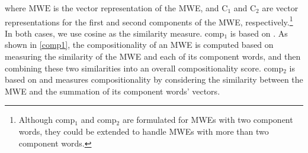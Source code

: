 \documentclass[11pt]{article}
\newcommand{\compone}{comp$_1$\xspace}
\newcommand{\comptwo}{comp$_2$\xspace}
\begin{document}
\noindent
where $\mathrm{MWE}$ is the vector representation of the MWE, and
$\mathrm{C}_{1}$ and $\mathrm{C}_{2}$ are vector representations for
the first and second components of the MWE,
respectively.\footnote{Although \compone and \comptwo are formulated
  for MWEs with two component words, they could be extended to handle
  MWEs with more than two component words.} In both cases, we use
cosine as the similarity measure. \compone is based on
\cite{reddy2011empirical}. As shown in \eqref{comp1}, the
compositionality of an MWE is computed based on measuring the
similarity of the MWE and each of its component words, and then
combining these two similarities into an overall compositionality
score. \comptwo is based on \cite{mitchell2010composition} and
measures compositionality by considering the similarity between the
MWE and the summation of its component words' vectors.






\end{document}
